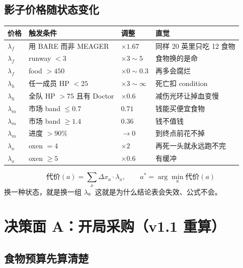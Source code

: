 \documentclass[UTF8,11pt,a4paper]{ctexart}
\begin{document}
\subsection{影子价格随状态变化}

\begin{center}
\small
\begin{longtable}{@{}p{1.8cm}p{5.6cm}p{2.8cm}p{4.4cm}@{}}
\toprule
\textbf{价格} & \textbf{触发条件} & \textbf{调整} & \textbf{直觉} \\
\midrule
\endhead
$\lambda_f$ & 用 BARE 而非 MEAGER & $\times 1.67$ & 同样 20 英里只吃 12 食物 \\
$\lambda_f$ & runway $<3$ & $\times 3\sim5$ & 食物换的是命 \\
$\lambda_f$ & food $>450$ & $\times 0\sim0.3$ & 再多会腐烂 \\
$\lambda_h$ & 任一成员 HP $<25$ & $\times 3\sim\infty$ & 死亡扣 condition \\
$\lambda_h$ & 全队 HP $>75$ 且有 Doctor & $\times 0.6$ & 减伤光环让掉血变慢 \\
$\lambda_m$ & 市场 band $\le0.7$ & $0.71$ & 钱能买便宜食物 \\
$\lambda_m$ & 市场 band $\ge1.4$ & $0.36$ & 钱不值钱 \\
$\lambda_m$ & 进度 $>90\%$ & $\to 0$ & 到终点前花不掉 \\
$\lambda_o$ & oxen $=4$ & $\times 2$ & 再死一头就永远跑不完 \\
$\lambda_o$ & oxen $\ge5$ & $\times 0.6$ & 有缓冲 \\
\bottomrule
\end{longtable}
\end{center}

\begin{keybox}[title={核心算式没变}]
\[
\text{代价}(a)=\sum_x \Delta x_a\cdot\lambda_x,\qquad a^{*}=\arg\min_a \text{代价}(a)
\]
换一种状态，就是换一组 $\lambda$。这就是为什么结论表会失效、公式不会。
\end{keybox}

\section{决策面 A：开局采购（v1.1 重算）}

\subsection{食物预算先算清楚}
\end{document}
